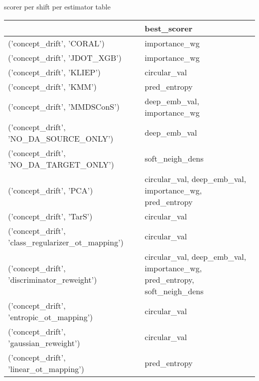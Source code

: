 \subsectionBest scorer per shift per estimator table\begin{tabular}{ll}
\hline
                                                     & best\_scorer                                                              \\
\hline
 ('concept\_drift', 'CORAL')                          & importance\_wg                                                            \\
 ('concept\_drift', 'JDOT\_XGB')                       & importance\_wg                                                            \\
 ('concept\_drift', 'KLIEP')                          & circular\_val                                                             \\
 ('concept\_drift', 'KMM')                            & pred\_entropy                                                             \\
 ('concept\_drift', 'MMDSConS')                       & deep\_emb\_val, importance\_wg                                              \\
 ('concept\_drift', 'NO\_DA\_SOURCE\_ONLY')              & deep\_emb\_val                                                             \\
 ('concept\_drift', 'NO\_DA\_TARGET\_ONLY')              & soft\_neigh\_dens                                                          \\
 ('concept\_drift', 'PCA')                            & circular\_val, deep\_emb\_val, importance\_wg, pred\_entropy                  \\
 ('concept\_drift', 'TarS')                           & circular\_val                                                             \\
 ('concept\_drift', 'class\_regularizer\_ot\_mapping')   & circular\_val                                                             \\
 ('concept\_drift', 'discriminator\_reweight')         & circular\_val, deep\_emb\_val, importance\_wg, pred\_entropy, soft\_neigh\_dens \\
 ('concept\_drift', 'entropic\_ot\_mapping')            & circular\_val                                                             \\
 ('concept\_drift', 'gaussian\_reweight')              & circular\_val                                                             \\
 ('concept\_drift', 'linear\_ot\_mapping')              & pred\_entropy                                                             \\

\end{tabular}
